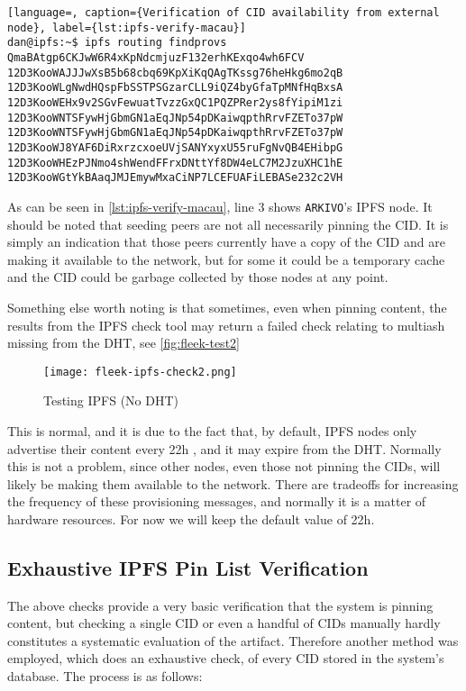 \begin{lstlisting}[language=, caption={Verification of CID availability from external node}, label={lst:ipfs-verify-macau}] 
dan@ipfs:~$ ipfs routing findprovs QmaBAtgp6CKJwW6R4xKpNdcmjuzF132erhKExqo4wh6FCV
12D3KooWAJJJwXsB5b68cbq69KpXiKqQAgTKssg76heHkg6mo2qB
12D3KooWLgNwdHQspFbSSTPSGzarCLL9iQZ4byGfaTpMNfHqBxsA
12D3KooWEHx9v2SGvFewuatTvzzGxQC1PQZPRer2ys8fYipiM1zi
12D3KooWNTSFywHjGbmGN1aEqJNp54pDKaiwqpthRrvFZETo37pW
12D3KooWNTSFywHjGbmGN1aEqJNp54pDKaiwqpthRrvFZETo37pW
12D3KooWJ8YAF6DiRxrzcxoeUVjSANYxyxU55ruFgNvQB4EHibpG
12D3KooWHEzPJNmo4shWendFFrxDNttYf8DW4eLC7M2JzuXHC1hE
12D3KooWGtYkBAaqJMJEmywMxaCiNP7LCEFUAFiLEBASe232c2VH
\end{lstlisting}

As can be seen in \autoref{lst:ipfs-verify-macau}, line 3 shows \texttt{ARKIVO}'s IPFS node. It should be noted that seeding peers are not all necessarily pinning the CID. It is simply an indication that those peers currently have a copy of the CID and are making it available to the network, but for some it could be a temporary cache and the CID could be garbage collected by those nodes at any point.

Something else worth noting is that sometimes, even when pinning content, the results from the IPFS check tool may return a failed check relating to multiash missing from the DHT, see \autoref{fig:fleek-test2}

\begin{figure}[H]
    \centering
    \texttt{[image: fleek-ipfs-check2.png]}
    \caption[Testing IPFS (No DHT)]{Testing IPFS (No DHT)}
    \label{fig:fleek-test2}
\end{figure}

This is normal, and it is due to the fact that, by default, IPFS nodes only advertise their content every 22h \cite{KuboConfigFile2024}, and it may expire from the DHT. Normally this is not a problem, since other nodes, even those not pinning the CIDs, will likely be making them available to the network. There are tradeoffs for increasing the frequency of these provisioning messages, and normally it is a matter of hardware resources. For now we will keep the default value of 22h.


\subsection{Exhaustive IPFS Pin List Verification}

The above checks provide a very basic verification that the system is pinning content, but checking a single CID or even a handful of CIDs manually hardly constitutes a systematic evaluation of the artifact.
Therefore another method was employed, which does an exhaustive check, of every CID stored in the system's database.
The process is as follows:

